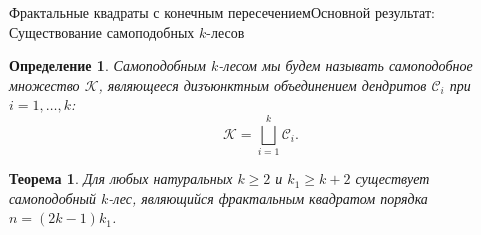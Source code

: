 \documentclass[aspectratio=1610, 10pt, notheorems]{beamer}
\newtheorem{theorem}     {Теорема}
\newtheorem{definition}  {Определение}
\begin{document}
\begin{frame}{Фрактальные квадраты с конечным пересечением}{Основной результат: Существование самоподобных $k$-лесов}
\begin{definition}\label{def:forest}
Самоподобным $k$-лесом мы будем называть самоподобное множество $\mathcal{K}$, являющееся дизъюнктным объединением дендритов $\mathcal{C}_i$ при $i=1,\ldots,k$:
$$\mathcal{K}=\bigsqcup_{i=1}^k\mathcal{C}_i.$$
\end{definition}
\begin{theorem}\label{thm:mainresult}
Для любых натуральных $k\geq2$  и  $ k_1\ge k+2$ существует самоподобный $k$-лес, являющийся фрактальным квадратом порядка $n=(2k-1)k_1$.
\end{theorem} 
\end{frame}
\end{document}
